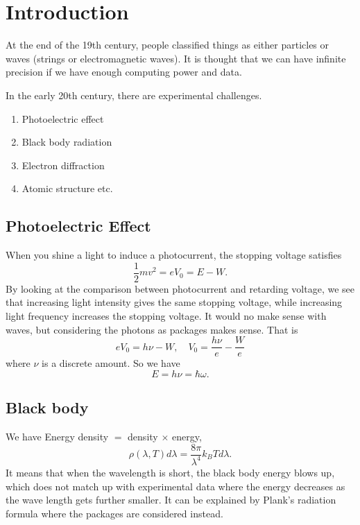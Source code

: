 \section*{Introduction}
At the end of the 19th century, people classified things as either particles or waves (strings or electromagnetic waves). It is thought that we can have infinite precision if we have enough computing power and data.

In the early 20th century, there are experimental challenges.
\begin{enumerate}
    \item Photoelectric effect
    \item Black body radiation
    \item Electron diffraction
    \item Atomic structure etc.
\end{enumerate}

\subsection{Photoelectric Effect}
When you shine a light to induce a photocurrent, the stopping voltage satisfies
\[
    \frac{1}{2}m v^2 = eV_0= E - W.
\]
By looking at the comparison between photocurrent and retarding voltage, we see that increasing light intensity gives the same stopping voltage, while increasing light frequency increases the stopping voltage. It would no make sense with waves, but considering the photons as packages makes sense. That is
\[
    eV_0 = h\nu - W,\quad V_0 = \frac{h\nu}{e} - \frac{W}{e}
\]
where \(\nu\) is a discrete amount. So we have
\[
    E = h\nu = \hbar \omega.
\]

\subsection{Black body}
We have Energy density \(=\) density \(\times\) energy,
\[
    \rho(\lambda,T)d\lambda = \frac{8\pi}{\lambda^4}k_B Td\lambda.
\]
It means that when the wavelength is short, the black body energy blows up, which does not match up with experimental data where the energy decreases as the wave length gets further smaller. It can be explained by Plank's radiation formula where the packages are considered instead.